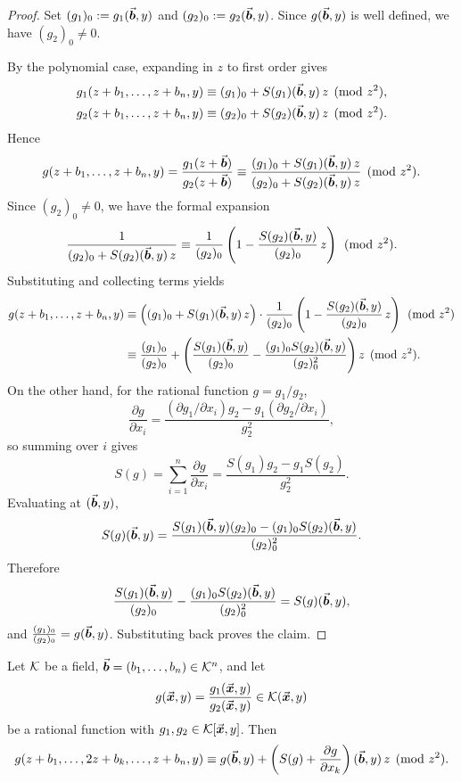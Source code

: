 \documentclass{article}
\numberwithin{equation}{section}
\begin{document}
\begin{proof}
Set $(g_1)_0:=g_1(\vec{\boldsymbol{b}},y)$ and $(g_2)_0:=g_2(\vec{\boldsymbol{b}},y)$. Since $g(\vec{\boldsymbol{b}},y)$ is well defined, we have $(g_2)_0\neq 0$.

By the polynomial case, expanding in $z$ to first order gives
\[
\begin{aligned}
g_1(z+b_1,\dots,z+b_n,y) &\equiv (g_1)_0 + S(g_1)(\vec{\boldsymbol{b}},y)\,z \pmod{z^2},\\
g_2(z+b_1,\dots,z+b_n,y) &\equiv (g_2)_0 + S(g_2)(\vec{\boldsymbol{b}},y)\,z \pmod{z^2}.
\end{aligned}
\]
Hence
\[
g(z+b_1,\dots,z+b_n,y)
= \frac{g_1(z+\vec{\boldsymbol{b}})}{g_2(z+\vec{\boldsymbol{b}})}
\equiv
\frac{(g_1)_0 + S(g_1)(\vec{\boldsymbol{b}},y)\,z}{(g_2)_0 + S(g_2)(\vec{\boldsymbol{b}},y)\,z}
\pmod{z^2}.
\]
Since $(g_2)_0\neq 0$, we have the formal expansion
\[
\frac{1}{(g_2)_0 + S(g_2)(\vec{\boldsymbol{b}},y)\,z}
\equiv
\frac{1}{(g_2)_0}\left(1 - \frac{S(g_2)(\vec{\boldsymbol{b}},y)}{(g_2)_0}\,z\right)
\pmod{z^2}.
\]
Substituting and collecting terms yields
\[
\begin{aligned}
g(z+b_1,\dots,z+b_n,y)
&\equiv
\left((g_1)_0 + S(g_1)(\vec{\boldsymbol{b}},y)\,z\right)
\cdot
\frac{1}{(g_2)_0}
\left(1 - \frac{S(g_2)(\vec{\boldsymbol{b}},y)}{(g_2)_0}\,z\right)
\pmod{z^2}\\
&\equiv
\frac{(g_1)_0}{(g_2)_0}
+
\left(
\frac{S(g_1)(\vec{\boldsymbol{b}},y)}{(g_2)_0}
-
\frac{(g_1)_0 S(g_2)(\vec{\boldsymbol{b}},y)}{(g_2)_0^2}
\right) z
\pmod{z^2}.
\end{aligned}
\]
On the other hand, for the rational function $g=g_1/g_2$,
\[
\frac{\partial g}{\partial x_i}
=
\frac{(\partial g_1/\partial x_i)g_2 - g_1(\partial g_2/\partial x_i)}{g_2^2},
\]
so summing over $i$ gives
\[
S(g)=\sum_{i=1}^n \frac{\partial g}{\partial x_i}=\frac{S(g_1)g_2 - g_1 S(g_2)}{g_2^2}.
\]
Evaluating at $(\vec{\boldsymbol{b}},y)$,
\[
S(g)(\vec{\boldsymbol{b}},y)
=
\frac{S(g_1)(\vec{\boldsymbol{b}},y)(g_2)_0 - (g_1)_0 S(g_2)(\vec{\boldsymbol{b}},y)}{(g_2)_0^2}.
\]
Therefore
\[
\frac{S(g_1)(\vec{\boldsymbol{b}},y)}{(g_2)_0}
-
\frac{(g_1)_0 S(g_2)(\vec{\boldsymbol{b}},y)}{(g_2)_0^2}
=
S(g)(\vec{\boldsymbol{b}},y),
\]
and $\frac{(g_1)_0}{(g_2)_0}=g(\vec{\boldsymbol{b}},y)$. Substituting back proves the claim.
\end{proof}



\begin{lemma}\label{lm-3}
Let ${\mathcal{K}}$ be a field, $\vec{\boldsymbol{b}}=(b_1,\dots,b_n)\in{\mathcal{K}}^n$, and let
\[
g(\vec{\boldsymbol{x}},y)=\frac{g_1(\vec{\boldsymbol{x}},y)}{g_2(\vec{\boldsymbol{x}},y)}\in {\mathcal{K}}(\vec{\boldsymbol{x}},y)
\]
be a rational function with $g_1,g_2\in{\mathcal{K}}[\vec{\boldsymbol{x}},y]$. Then
\[
g(z+b_1,\dots,2z+b_k,\dots,z+b_n,y)
\equiv
g(\vec{\boldsymbol{b}},y)+\left(S(g)+\frac{\partial g}{\partial x_k}\right)(\vec{\boldsymbol{b}},y)\,z
\pmod{z^2}.
\]
\end{lemma}
\end{document}
